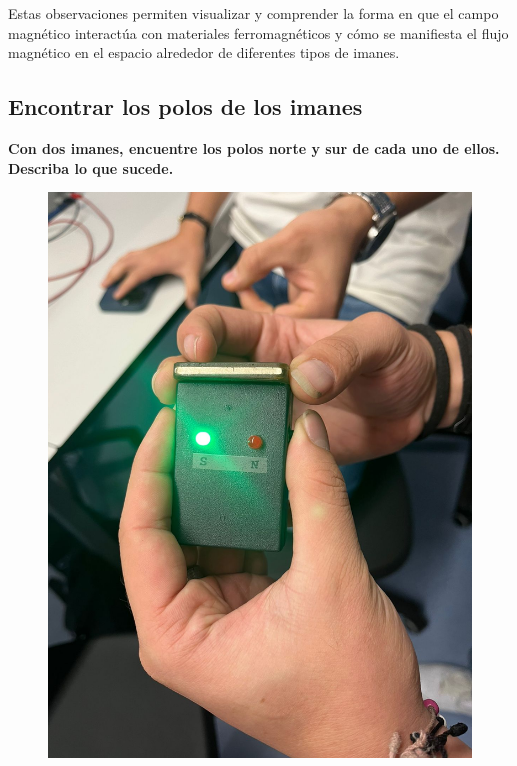 Estas observaciones permiten visualizar y comprender la forma en que el campo magnético interactúa con materiales ferromagnéticos y cómo se manifiesta el flujo magnético en el espacio alrededor de diferentes tipos de imanes.


\subsection{Encontrar los polos de los imanes}
\textbf{Con dos imanes, encuentre los polos norte y sur de cada uno de ellos.
Describa lo que sucede.}

\begin{figure}[H]
  \centering
  \begin{minipage}{0.3\textwidth}
    \centering
    \includegraphics[width=\textwidth]{Figures/1. Content/BuscarPolaridad5.jpeg}
    \label{fig: Polaridad Positiva del Iman 1}
  \end{minipage}

\end{figure}
